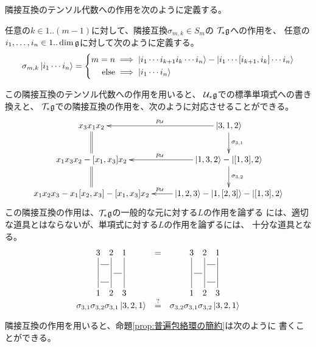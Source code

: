 {	隣接互換のテンソル代数への作用を次のように定義する。

	\begin{definition}[隣接互換のテンソル代数への作用]
	\label{def:隣接互換のテンソル代数への作用} %
		任意の$k\in 1..(m-1)$に対して、隣接互換$\sigma_{m,k}\in S_m$の
		${{\mathcal{T}}}_*{\mathfrak{g}}$への作用を、
		任意の$i_1,\dots,i_n\in 1..\dim{\mathfrak{g}}$に対して次のように定義する。
		\begin{equation*}\begin{split}
			\sigma_{m,k}\mathinner{|{i_1\cdots i_n}\rangle} = \left\{\begin{split}
				m = n &\implies\mathinner{|{i_1\cdots i_{k+1}i_{k}\cdots i_n}\rangle}
					- \mathinner{|{i_1\cdots [i_{k+1},i_{k}]\cdots i_n}\rangle} \\
				\text{else} &\implies \mathinner{|{i_1\cdots i_n}\rangle} \\
			\end{split}\right. \\
		\end{split}\end{equation*}
	\end{definition} %

	この隣接互換のテンソル代数への作用を用いると、
	${{\mathcal{U}}}_*{\mathfrak{g}}$での標準単項式への書き換えと、
	${{\mathcal{T}}}_*{\mathfrak{g}}$での隣接互換の作用を、次のように対応させることができる。
	\begin{equation*}\xymatrix{
		x_3x_1x_2 \ar@{=}[d]
			& \ket{3,1,2} \ar[d]^{\sigma_{3,1}} \ar[l]_{p_\U} \\
		x_1x_3x_2 - [x_1,x_3]x_2 \ar@{=}[d]
		& \ket{1,3,2} - \ket{[1,3],2} \ar[d]^{\sigma_{3,2}} \ar[l]_{p_\U} \\
		x_1x_2x_3 - x_1[x_2,x_3] - [x_1,x_3]x_2
		& \ket{1,2,3} - \ket{1,[2,3]} - \ket{[1,3],2} \ar[l]_{p_\U} \\
	}\end{equation*}
	この隣接互換の作用は、${{\mathcal{T}}}_*{\mathfrak{g}}$の一般的な元に対する$L$の作用を論ずる
	には、適切な道具とはならないが、単項式に対する$L$の作用を論ずるには、
	十分な道具となる。
	\begin{equation*}\begin{array}{ccc}
		\xymatrix@R=1ex@C=1ex{
			3 \ar@{-}[dddd] & 2 \ar@{-}[dddd] & 1 \ar@{-}[dddd] \\
			\ar@{-}[r] & \\
			& \ar@{-}[r] & \\
			\ar@{-}[r] & \\
			1 & 2 & 3 \\
		} &=& \xymatrix@R=1ex@C=1ex{
			3 \ar@{-}[dddd] & 2 \ar@{-}[dddd] & 1 \ar@{-}[dddd] \\
			& \ar@{-}[r] & \\
			\ar@{-}[r] & \\
			& \ar@{-}[r] & \\
			1 & 2 & 3 \\
		} \\
		\sigma_{3,1}\sigma_{3,2}\sigma_{3,1}\ket{3,2,1}
		&\udset{?}{}{=}& \sigma_{3,2}\sigma_{3,1}\sigma_{3,2}\ket{3,2,1} 
	\end{array}\end{equation*}
	隣接互換の作用を用いると、命題\ref{prop:普遍包絡環の簡約}は次のように
	書くことができる。

}
